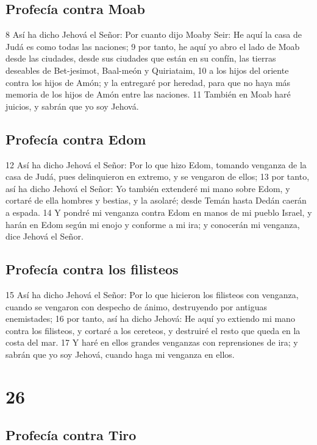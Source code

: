 \section*{Profecía contra Moab}

8 Así ha dicho Jehová el Señor: Por cuanto dijo Moaby Seir: He aquí la casa de Judá es como todas las naciones;
9 por tanto, he aquí yo abro el lado de Moab desde las ciudades, desde sus ciudades que están en su confín, las tierras deseables de Bet-jesimot, Baal-meón y Quiriataim,
10 a los hijos del oriente contra los hijos de Amón; y la entregaré por heredad, para que no haya más memoria de los hijos de Amón entre las naciones.
11 También en Moab haré juicios, y sabrán que yo soy Jehová.

\section*{Profecía contra Edom}

12 Así ha dicho Jehová el Señor: Por lo que hizo Edom, tomando venganza de la casa de Judá, pues delinquieron en extremo, y se vengaron de ellos;
13 por tanto, así ha dicho Jehová el Señor: Yo también extenderé mi mano sobre Edom, y cortaré de ella hombres y bestias, y la asolaré; desde Temán hasta Dedán caerán a espada.
14 Y pondré mi venganza contra Edom en manos de mi pueblo Israel, y harán en Edom según mi enojo y conforme a mi ira; y conocerán mi venganza, dice Jehová el Señor.

\section*{Profecía contra los filisteos}

15 Así ha dicho Jehová el Señor: Por lo que hicieron los filisteos con venganza, cuando se vengaron con despecho de ánimo, destruyendo por antiguas enemistades;
16 por tanto, así ha dicho Jehová: He aquí yo extiendo mi mano contra los filisteos, y cortaré a los cereteos, y destruiré el resto que queda en la costa del mar.
17 Y haré en ellos grandes venganzas con reprensiones de ira; y sabrán que yo soy Jehová, cuando haga mi venganza en ellos.

\chapter{26}

\section*{Profecía contra Tiro}

